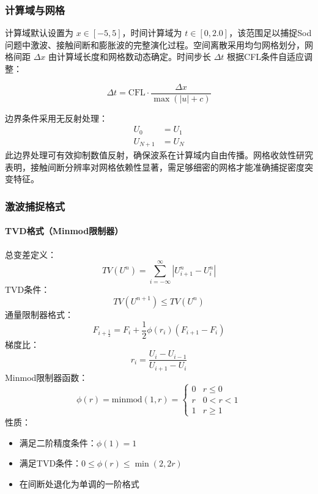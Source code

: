 \documentclass[UTF8]{ctexart}
\begin{document}
\subsubsection{计算域与网格}

计算域默认设置为 $x \in [-5, 5]$，时间计算域为 $t \in [0, 2.0]$，该范围足以捕捉Sod问题中激波、接触间断和膨胀波的完整演化过程。空间离散采用均匀网格划分，网格间距 $\Delta x$ 由计算域长度和网格数动态确定。时间步长 $\Delta t$ 根据CFL条件自适应调整：

\begin{equation}
\Delta t = \text{CFL} \cdot \frac{\Delta x}{\max(|u| + c)}
\end{equation}

边界条件采用无反射处理：
\begin{align*}
U_0 &= U_1 \\
U_{N+1} &= U_N
\end{align*}
此边界处理可有效抑制数值反射，确保波系在计算域内自由传播。网格收敛性研究表明，接触间断分辨率对网格依赖性显著，需足够细密的网格才能准确捕捉密度突变特征。

\subsubsection{激波捕捉格式}
\paragraph{TVD格式（Minmod限制器）}

总变差定义：
\begin{equation}
TV(U^n) = \sum_{i=-\infty}^{\infty} |U_{i+1}^n - U_i^n|
\end{equation}
TVD条件：
\begin{equation}
TV(U^{n+1}) \leq TV(U^n)
\end{equation}
通量限制器格式：
\begin{equation}
F_{i+\frac{1}{2}} = F_i + \frac{1}{2} \phi(r_i) (F_{i+1} - F_i)
\end{equation}
梯度比：
\begin{equation}
r_i = \frac{U_i - U_{i-1}}{U_{i+1} - U_i}
\end{equation}
Minmod限制器函数：
\begin{equation}
\phi(r) = \text{minmod}(1, r) = 
\begin{cases} 
0 & r \leq 0 \\
r & 0 < r < 1 \\
1 & r \geq 1 
\end{cases}
\end{equation}
性质：
\begin{itemize}
\item 满足二阶精度条件：$\phi(1)=1$
\item 满足TVD条件：$0 \leq \phi(r) \leq \min(2,2r)$
\item 在间断处退化为单调的一阶格式
\end{itemize}
\end{document}
